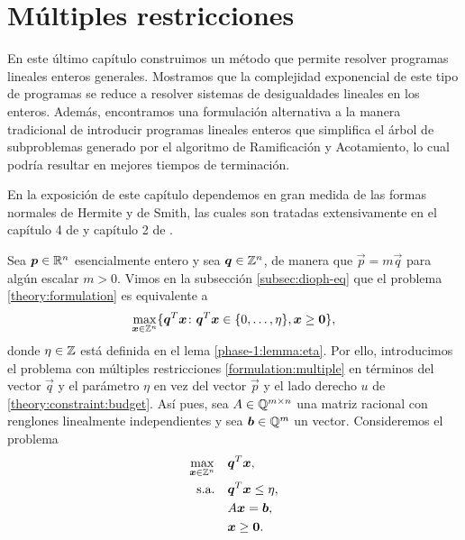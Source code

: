 \chapter{Múltiples restricciones}
\noindent
En este último capítulo construimos un método que permite resolver programas lineales enteros
generales. Mostramos que la complejidad exponencial de este tipo de programas se reduce a resolver
sistemas de desigualdades lineales en los enteros. Además, encontramos una formulación alternativa a
la manera tradicional de introducir programas lineales enteros que simplifica el árbol de
subproblemas generado por el algoritmo de Ramificación y Acotamiento, lo cual podría resultar en
mejores tiempos de terminación.

En la exposición de este capítulo dependemos en gran medida de las formas normales de Hermite y de
Smith, las cuales son tratadas extensivamente en el capítulo 4 de \cite{alex} y capítulo 2 de
\cite{morris}.

Sea $\boldsymbol{p} \in \mathbb{R}^n$ esencialmente entero y sea $\boldsymbol{q} \in \mathbb{Z}^n$, de manera que $\vec{p} =
m\vec{q}$ para algún escalar $m > 0$. Vimos en la subsección \ref{subsec:dioph-eq} que el problema
\eqref{theory:formulation} es equivalente a
\begin{equation*}
	\max_{\boldsymbol{x} \in \mathbb{Z}^n}
	\lbrace \boldsymbol{q}^T\boldsymbol{x} \colon \boldsymbol{q}^T\boldsymbol{x} \in \lbrace 0, \ldots, \eta \rbrace, \boldsymbol{x}
	\geq \boldsymbol{0} \rbrace,
\end{equation*}
donde $\eta \in \mathbb{Z}$ está definida en el lema \ref{phase-1:lemma:eta}. Por ello, introducimos el
problema con múltiples restricciones \eqref{formulation:multiple} en términos del vector $\vec{q}$ y
el parámetro $\eta$ en vez del vector $\vec{p}$ y el lado derecho $u$ de
\eqref{theory:constraint:budget}. Así pues, sea $A \in \mathbb{Q}^{m \times n}$ una matriz racional con
renglones linealmente independientes y sea $\boldsymbol{b} \in \mathbb{Q}^m$ un vector. Consideremos el problema
\begin{subequations}
	\label{formulation:multiple}
	\begin{align}
		\max_{\boldsymbol{x} \in \mathbb{Z}^n} \quad
			& \boldsymbol{q}^T\boldsymbol{x}, \label{formulation:multiple:objective} \\
		\text{s.a.} \quad
			& \boldsymbol{q}^T\boldsymbol{x} \leq \eta, \label{formulation:multiple:constraint:budget} \\
			& A\boldsymbol{x} = \boldsymbol{b}, \label{formulation:multiple:constraints} \\
			& \boldsymbol{x} \geq \boldsymbol{0}. \nonumber
	\end{align}
\end{subequations}

